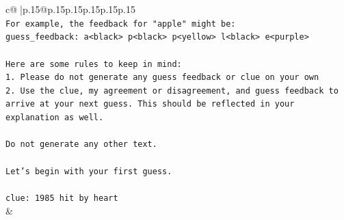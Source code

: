 \documentclass{article}
\begin{document}
{\begin{supertabular}{c@{$\;$}|p{.15\linewidth}@{}p{.15\linewidth}p{.15\linewidth}p{.15\linewidth}p{.15\linewidth}p{.15\linewidth}}
{{{\\ 
\texttt{For example, the feedback for "apple" might be:} \\
\texttt{guess\_feedback: a<black> p<black> p<yellow> l<black> e<purple>} \\
\\ 
\texttt{Here are some rules to keep in mind:} \\
\texttt{1. Please do not generate any guess feedback or clue on your own} \\
\texttt{2. Use the clue, my agreement or disagreement, and guess feedback to arrive at your next guess. This should be reflected in your explanation as well.} \\
\\ 
\texttt{Do not generate any other text.} \\
\\ 
\texttt{Let's begin with your first guess.} \\
\\ 
\texttt{clue: 1985 hit by heart} \\
            }
        }
    }
    & \\ \\


\end{supertabular}}
\end{document}
